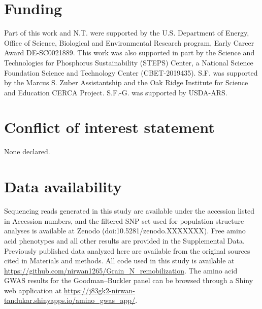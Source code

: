 \documentclass[namedate,unnumsec,webpdf,contemporary,large]{oup-authoring-template}
\begin{document}
\section{Funding}
Part of this work and N.T. were supported by the U.S. Department of Energy, Office of Science, Biological and Environmental Research program, Early Career Award DE-SC0021889. This work was also supported in part by the Science and Technologies for Phosphorus Sustainability (STEPS) Center, a National Science Foundation Science and Technology Center (CBET-2019435). S.F. was supported by the Marcus S. Zuber Assistantship and the Oak Ridge Institute for Science and Education CERCA Project. S.F.-G. was supported by USDA-ARS.

\section{Conflict of interest statement}
None declared.

\section{Data availability}
Sequencing reads generated in this study are available under the accession listed in Accession numbers, and the filtered SNP set used for population structure analyses is available at Zenodo (doi:10.5281/zenodo.XXXXXXX). Free amino acid phenotypes and all other results are provided in the Supplemental Data. Previously published data analyzed here are available from the original sources cited in Materials and methods. All code used in this study is available at \url{https://github.com/nirwan1265/Grain_N_remobilization}. The amino acid GWAS results for the Goodman--Buckler panel can be browsed through a Shiny web application at \url{https://j83gk2-nirwan-tandukar.shinyapps.io/amino_gwas_app/}.




\end{document}
